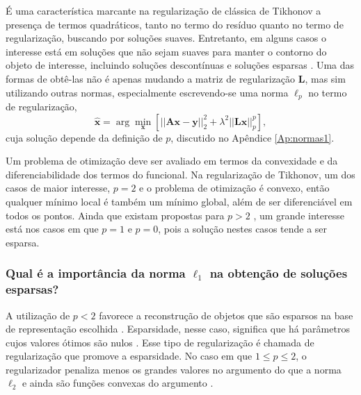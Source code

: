 É uma característica marcante na regularização de clássica de Tikhonov a presença de termos quadráticos, tanto no termo do resíduo quanto no termo de regularização, buscando por soluções suaves. Entretanto, em alguns casos o interesse está em soluções que não sejam suaves para manter o contorno do objeto de interesse, incluindo soluções descontínuas e soluções esparsas \cite{Benning2018}. Uma das formas de obtê-las não é apenas mudando a matriz de regularização $\mathbf{L}$, mas sim utilizando outras normas, especialmente escrevendo-se uma norma $\ell_p$ no termo de regularização, 
\begin{equation}
\hat{\mathbf{x}} = \arg\min\limits_{\mathbf{x}} \left[ \vert \vert \mathbf{A} \mathbf{x} - \mathbf{y} \vert \vert^2_2 + \lambda^2 \vert \vert \mathbf{L} \mathbf{x} \vert \vert_p^p \right],
\label{eq:normap}
\end{equation}
cuja solução depende da definição de $p$, discutido no Apêndice \ref{Ap:normas1}.

Um problema de otimização deve ser avaliado em termos da convexidade e da diferenciabilidade dos termos do funcional. Na regularização de Tikhonov, um dos casos de maior interesse,  $p = 2$ e o problema de otimização é convexo, então qualquer mínimo local é também um mínimo global, além de ser diferenciável em todos os pontos. Ainda que existam propostas para  $p > 2$ \cite{Adil2019}, um grande interesse está nos casos em que $ p = 1$ e $p=0$, pois a solução nestes casos tende a ser esparsa. 

\subsubsection{Qual é a importância da norma $\ell_1$ na obtenção de soluções esparsas?}
A utilização de $p < 2$ favorece a reconstrução de objetos que são esparsos na base de representação escolhida \cite{Daubechies2004, Daubechies2016}. Esparsidade, nesse caso, significa que há parâmetros cujos valores ótimos são nulos \cite[pág. 236]{goodfellow2016deep}. Esse tipo de regularização é chamada de regularização que promove a esparsidade. No caso em que $1 \leq p \leq 2$, o regularizador penaliza menos os grandes valores no argumento do que a norma $\ell_2$ e ainda são funções convexas do argumento \cite[pág. 194]{bovik2005handbook}. 

